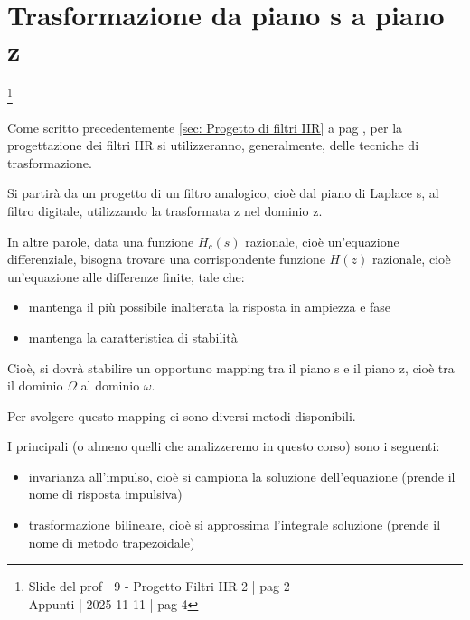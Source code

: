 \section{Trasformazione da piano s a piano z}

\footnote{ 
    Slide del prof | 9 - Progetto Filtri IIR 2 | pag 2\\ 
    Appunti | 2025-11-11 | pag 4 
} 

Come scritto precedentemente \ref{sec: Progetto di filtri IIR}  a pag \pageref{sec: Progetto di filtri IIR}, 
per la progettazione dei filtri IIR si utilizzeranno, generalmente, delle tecniche di trasformazione. \newline 

Si partirà da un progetto di un filtro analogico, cioè dal piano di Laplace s, al filtro digitale, utilizzando la trasformata z nel dominio z. \newline  

In altre parole, data una funzione $H_c \left(s\right)$ razionale, cioè un'equazione differenziale, bisogna trovare 
una corrispondente funzione $H \left(z\right)$ razionale, cioè un'equazione alle differenze finite, tale che: 

\begin{itemize}
    \item mantenga il più possibile inalterata la risposta in ampiezza e fase 
    \item mantenga la caratteristica di stabilità 
\end{itemize}

Cioè, si dovrà stabilire un opportuno mapping tra il piano s e il piano z, cioè tra il dominio $\Omega$ al dominio $\omega$. \newline 

Per svolgere questo mapping ci sono diversi metodi disponibili. \newline 

I principali (o almeno quelli che analizzeremo in questo corso) sono i seguenti: 

\begin{itemize}
    \item invarianza all'impulso, cioè si campiona la soluzione dell'equazione (prende il nome di risposta impulsiva)
    \item trasformazione bilineare, cioè si approssima l'integrale soluzione (prende il nome di metodo trapezoidale)
\end{itemize}

